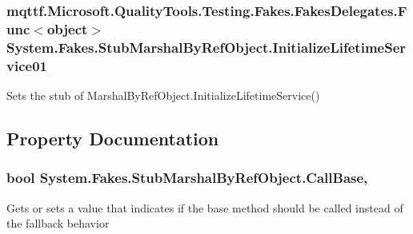 \hypertarget{class_system_1_1_fakes_1_1_stub_marshal_by_ref_object_a3c8b8e8d31888cd89a1b4245b1c6ca56}{
\subsubsection[{Initialize\-Lifetime\-Service01}]{\setlength{\rightskip}{0pt plus 5cm}mqttf.\-Microsoft.\-Quality\-Tools.\-Testing.\-Fakes.\-Fakes\-Delegates.\-Func$<$object$>$ System.\-Fakes.\-Stub\-Marshal\-By\-Ref\-Object.\-Initialize\-Lifetime\-Service01}}\label{class_system_1_1_fakes_1_1_stub_marshal_by_ref_object_a3c8b8e8d31888cd89a1b4245b1c6ca56}


Sets the stub of Marshal\-By\-Ref\-Object.\-Initialize\-Lifetime\-Service()



\subsection{Property Documentation}
\hypertarget{class_system_1_1_fakes_1_1_stub_marshal_by_ref_object_a6e98894592221f4ed1947e0594779739}{
\subsubsection[{Call\-Base}]{\setlength{\rightskip}{0pt plus 5cm}bool System.\-Fakes.\-Stub\-Marshal\-By\-Ref\-Object.\-Call\-Base\hspace{0.3cm}{\ttfamily [get]}, {\ttfamily [set]}}}\label{class_system_1_1_fakes_1_1_stub_marshal_by_ref_object_a6e98894592221f4ed1947e0594779739}


Gets or sets a value that indicates if the base method should be called instead of the fallback behavior

